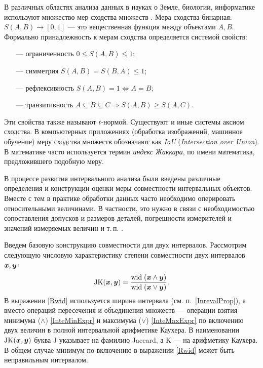 \documentclass[a5paper,openany]{book}
\newcommand{\mbf}[1]{\protect\text{\boldmath$#1$}}
\newcommand{\w}{\mathrm{wid}\;}
\begin{document}
В различных областях анализа данных в науках о Земле, биологии, информатике используют множество мер сходства множеств \cite{Jaccard}.  
Мера сходства бинарная: $S(A, B) \rightarrow [0, 1] $ --- это вещественная функция между объектами $A, B$. 
Формально  принадлежность к мерам сходства определяется системой свойств:
\begin{itemize}
\item[---] ограниченность $0 \leq 	S(A, B)  \leq 1 $;
\item[---] симметрия $	S(A, B) = S(B,A)  \leq 1$;
\item[---] рефлексивность $	S(A, B)=1  \Longleftrightarrow A=B $;
\item[---] транзитивность $ 	A \subseteq B \subseteq C \Longrightarrow   S(A, B) \geq S(A, C)  $.
\end{itemize}

Эти свойства также называют $t$-нормой. Существуют и иные системы аксиом сходства.
В компьютерных приложениях (обработка изображений, машинное обучение) меру сходства множеств  обозначают как \emph{IoU} (\emph{Intersection over Union}). В математике часто используется термин \emph{индекс Жаккара}, по имени математика, предложившего подобную меру.  

\label{JaccardMeasure}
В процессе развития интервального анализа были введены различные определения и конструкции оценки меры совместности интервальных объектов.
Вместе с тем в практике обработки данных часто необходимо оперировать относительными величинами. В частности, это нужно в связи с необходимостью сопоставления допусков и размеров деталей, погрешности измерителей и значений измеряемых величин и т.\,п. \cite{Kabir2017}.

Введем базовую конструкцию совместности для двух интервалов.
Рассмотрим  следующую числовую характеристику степени совместности  двух интервалов $\mbf{x}, \mbf{y}$:
\begin{equation}\label{Rwid}
\mathrm{JK}(\mbf{x}, \mbf{y}) = 
\frac{\w (\mbf{x} \wedge \mbf{y} )}{\w (\mbf{x} \vee \mbf{y})}.
\end{equation}
В выражении \eqref{Rwid} используется ширина интервала (см. п.~\ref{InrevalProp}), а вместо операций пересечения и объединения множеств --- операции взятия  минимума ($\wedge$) \eqref{InteMinExpr} и максимума ($\vee$) \eqref{InteMaxExpr} по включению двух величин в полной интервальной арифметике Каухера. В наименовании $\mathrm{JK}(\mbf{x}, \mbf{y})$ буква $\mathrm{J}$ указывает на фамилию 
Jaccard, а $\mathrm{K}$ --- на арифметику Каухера.
В общем случае минимум по включению в выражении \eqref{Rwid} может быть неправильным интервалом. 
\end{document}
